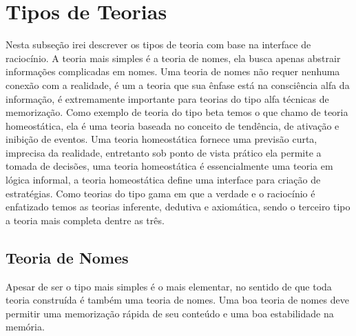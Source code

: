 \documentclass[10pt,a4paper]{report}
\begin{document}
\section{Tipos de Teorias}

\hspace{\baselineskip}

Nesta subseção irei descrever os tipos de teoria com base na interface de raciocínio. A teoria mais simples é a teoria de nomes, ela busca apenas abstrair informações complicadas em nomes. Uma teoria de nomes não requer nenhuma conexão com a realidade, é um a teoria que sua ênfase está na consciência alfa da informação, é extremamente importante para teorias do tipo alfa técnicas de memorização. Como exemplo de teoria do tipo beta temos o que chamo de teoria homeostática, ela é uma teoria baseada no conceito de tendência, de ativação e inibição de eventos. Uma teoria homeostática fornece uma previsão curta, imprecisa da realidade, entretanto sob ponto de vista prático ela permite a tomada de decisões, uma teoria homeostática é essencialmente uma teoria em lógica informal, a teoria homeostática define uma interface para criação de estratégias. Como teorias do tipo gama em que a verdade e o raciocínio é enfatizado temos as teorias inferente, dedutiva e axiomática, sendo o terceiro tipo a teoria mais completa dentre as três.


\subsection{Teoria de Nomes}

\hspace{\baselineskip}

Apesar de ser o tipo mais simples é o mais elementar, no sentido de que toda teoria construída é também uma teoria de nomes. Uma boa teoria de nomes deve permitir uma memorização rápida de seu conteúdo e uma boa estabilidade na memória.

\hspace{\baselineskip}
\end{document}

